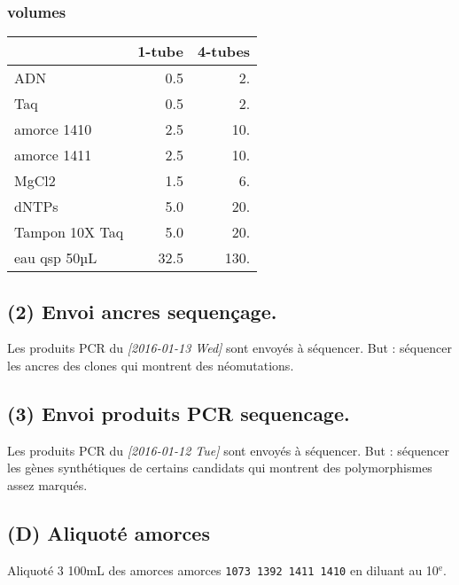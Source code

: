 \documentclass[9pt, oneside, twocolumn]{scrartcl}
\begin{document}
\subsubsection{volumes}
\label{sec:orgheadline47}
\begin{center}
\begin{tabular}{lrr}
\toprule
 & 1-tube & 4-tubes\\
\midrule
ADN & 0.5 & 2.\\
Taq & 0.5 & 2.\\
amorce 1410 & 2.5 & 10.\\
amorce 1411 & 2.5 & 10.\\
MgCl2 & 1.5 & 6.\\
dNTPs & 5.0 & 20.\\
Tampon 10X Taq & 5.0 & 20.\\
\midrule
eau qsp 50µL & 32.5 & 130.\\
\bottomrule
\end{tabular}
\end{center}

\subsection{(2) Envoi ancres sequençage.}
\label{sec:orgheadline49}
Les produits PCR du \textit{[2016-01-13 Wed] } sont envoyés à séquencer. But : séquencer
les ancres des clones qui montrent des néomutations. 
\subsection{(3) Envoi produits PCR sequencage.}
\label{sec:orgheadline50}
Les produits PCR du \textit{[2016-01-12 Tue] } sont envoyés à séquencer. But : séquencer
les gènes synthétiques de certains candidats qui montrent des polymorphismes
assez marqués. 
\subsection{(D) Aliquoté amorces}
\label{sec:orgheadline51}
Aliquoté 3\texttimes{} 100mL des amorces amorces \texttt{1073 1392 1411 1410} en diluant au
10\(^{\text{e}}\).
\end{document}
